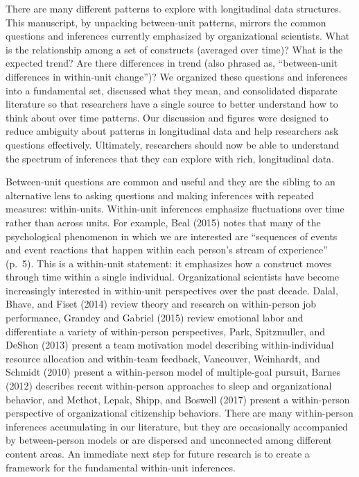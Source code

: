 \documentclass[english,,man]{apa6}
\theoremstyle{definition}
\theoremstyle{definition}
\theoremstyle{definition}
\theoremstyle{remark}
\begin{document}
There are many different patterns to explore with longitudinal data
structures. This manuscript, by unpacking between-unit patterns, mirrors
the common questions and inferences currently emphasized by
organizational scientists. What is the relationship among a set of
constructs (averaged over time)? What is the expected trend? Are there
differences in trend (also phrased as, \enquote{between-unit differences
in within-unit change})? We organized these questions and inferences
into a fundamental set, discussed what they mean, and consolidated
disparate literature so that researchers have a single source to better
understand how to think about over time patterns. Our discussion and
figures were designed to reduce ambiguity about patterns in longitudinal
data and help researchers ask questions effectively. Ultimately,
researchers should now be able to understand the spectrum of inferences
that they can explore with rich, longitudinal data.

Between-unit questions are common and useful and they are the sibling to
an alternative lens to asking questions and making inferences with
repeated measures: within-units. Within-unit inferences emphasize
fluctuations over time rather than across units. For example, Beal
(2015) notes that many of the psychological phenomenon in which we are
interested are \enquote{sequences of events and event reactions that
happen within each person's stream of experience} (p.~5). This is a
within-unit statement: it emphasizes how a construct moves through time
within a single individual. Organizational scientists have become
increasingly interested in within-unit perspectives over the past
decade. Dalal, Bhave, and Fiset (2014) review theory and research on
within-person job performance, Grandey and Gabriel (2015) review
emotional labor and differentiate a variety of within-person
perspectives, Park, Spitzmuller, and DeShon (2013) present a team
motivation model describing within-individual resource allocation and
within-team feedback, Vancouver, Weinhardt, and Schmidt (2010) present a
within-person model of multiple-goal pursuit, Barnes (2012) describes
recent within-person approaches to sleep and organizational behavior,
and Methot, Lepak, Shipp, and Boswell (2017) present a within-person
perspective of organizational citizenship behaviors. There are many
within-person inferences accumulating in our literature, but they are
occasionally accompanied by between-person models or are dispersed and
unconnected among different content areas. An immediate next step for
future research is to create a framework for the fundamental within-unit
inferences.
\end{document}

